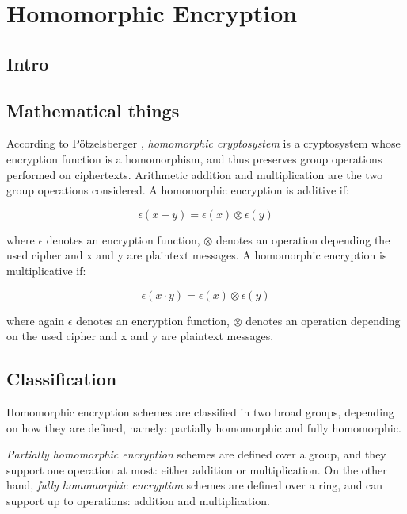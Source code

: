 \section{Homomorphic Encryption}

\subsection{Intro}

\subsection{Mathematical things}

According to P{\"o}tzelsberger \cite{potzelsberger2013kv},  \textit{homomorphic cryptosystem} is a cryptosystem whose encryption function is a homomorphism, and thus preserves group operations performed on ciphertexts. Arithmetic addition and multiplication are the two group operations considered.  A homomorphic encryption is additive if:

\begin{equation}
\epsilon(x+y) = \epsilon(x)\otimes \epsilon(y)
\end{equation}

where $\epsilon$ denotes an encryption function, $\otimes$ denotes an operation depending the used cipher and x and y are plaintext messages. A homomorphic encryption is multiplicative if:

\begin{equation}
\epsilon(x \cdot y) = \epsilon(x) \otimes \epsilon(y)
\end{equation}

where again $\epsilon$ denotes an encryption function, $\otimes$ denotes an operation depending on the used cipher and x and y are plaintext messages.

\subsection{Classification}

Homomorphic encryption schemes are classified in two broad groups, depending on how they are defined, namely: partially homomorphic and fully homomorphic. 

\textit{Partially homomorphic encryption} schemes are defined over a group, and they support one operation at most: either addition or multiplication. On the other hand, \textit{fully homomorphic encryption} schemes are defined over a ring, and can support up to operations: addition and multiplication.

